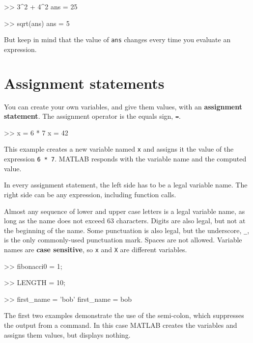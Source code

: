 \documentclass[main.tex]{subfiles}
\begin{document}
\begin{code}
>> 3^2 + 4^2
ans = 25

>> sqrt(ans)
ans = 5
\end{code}

But keep in mind that the value of {\tt ans} changes every time
you evaluate an expression.


\section{Assignment statements}

You can create your own variables, and give them values, with
an {\bf assignment statement}.  The assignment operator is the
equals sign, {\tt =}.


\begin{code}
>> x = 6 * 7
x = 42
\end{code}

This example creates a new variable named {\tt x} and assigns it the
value of the expression {\tt 6 * 7}.  MATLAB responds with the
variable name and the computed value.


In every assignment statement, the left side has to be a legal variable name.  The right side can be any expression, including function calls.


Almost any sequence of lower and upper case letters is a legal
variable name, as long as the name does not exceed 63 characters.  
Digits are also legal, but not at the beginning of the name.
Some punctuation is also legal, but the underscore,
\verb"_", is the only commonly-used punctuation mark.  
Spaces are not allowed.  Variable names are
{\bf case sensitive}, so {\tt x} and {\tt X} are different variables.

\begin{code}
>> fibonacci0 = 1;

>> LENGTH = 10;

>> first_name = 'bob'
first_name = bob
\end{code}

The first two examples demonstrate the use of the semi-colon, which
suppresses the output from a command.  In this case MATLAB creates the
variables and assigns them values, but displays nothing.
\end{document}
